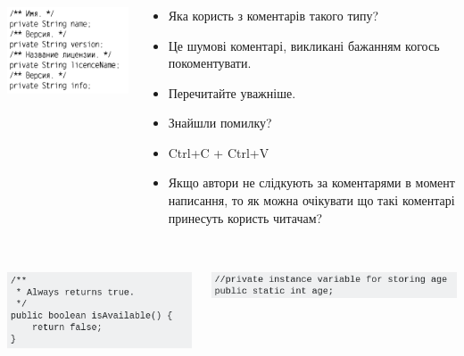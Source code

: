 \documentclass[12pt,pdf,utf8,ukrainian,aspectratio=169]{beamer}
\makeatletter
\newcommand*{\currentname}{\@currentlabelname}
\makeatother
\begin{document}
	\begin{frame}\frametitle{\currentname}
		\begin{columns}
			\begin{column}{8cm}
				\includegraphics[scale=0.7]{clean_code_15.png}
			\end{column}
			\begin{column}{7cm} 
				\footnotesize
				\begin{itemize}
					\item Яка користь з коментарів такого типу? \pause
					\item Це шумові коментарі, викликані бажанням когось покоментувати.\pause
					\item Перечитайте уважніше. \pause
					\item Знайшли помилку? \pause
					\item Ctrl+C + Ctrl+V
					\item Якщо автори не слідкують за коментарями в момент написання, то як можна очікувати що такі коментарі принесуть користь читачам?
				\end{itemize}
			\end{column}
		\end{columns}	
	\end{frame}	

	\begin{frame}\frametitle{\currentname}
		\begin{columns}
			\begin{column}{6cm}
				\includegraphics[scale=0.7]{Comment_07.png}
			\end{column}
			\begin{column}{8cm} 
				\includegraphics[scale=0.7]{Comment_03.png}
			\end{column}
		\end{columns}	
	\end{frame}	
\end{document}
